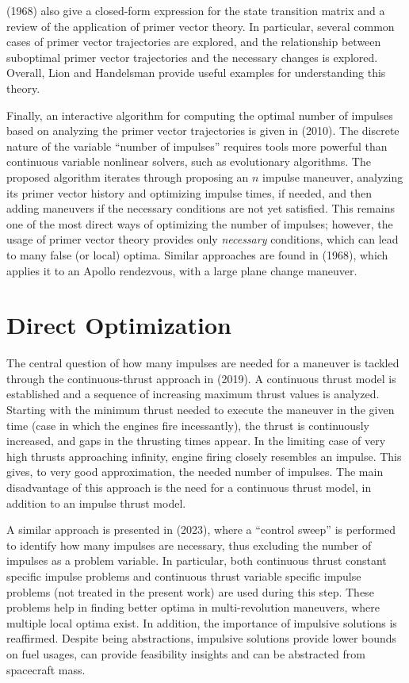 \citeauthor{fixed_time_primer_vector} (1968) also give a closed-form expression for the state transition matrix and a review of the application of primer vector theory. In particular, several common cases of primer vector trajectories are explored, and the relationship between suboptimal primer vector trajectories and the necessary changes is explored. Overall, Lion and Handelsman provide useful examples for understanding this theory. 

Finally, an interactive algorithm for computing the optimal number of impulses based on analyzing the primer vector trajectories is given in \citeauthor{interactive_primer_vector} (2010). The discrete nature of the variable ``number of impulses'' requires tools more powerful than continuous variable nonlinear solvers, such as evolutionary algorithms. The proposed algorithm iterates through proposing an \(n\) impulse maneuver, analyzing its primer vector history and optimizing impulse times, if needed, and then adding maneuvers if the necessary conditions are not yet satisfied. This remains one of the most direct ways of optimizing the number of impulses; however, the usage of primer vector theory provides only \textit{necessary} conditions, which can lead to many false (or local) optima. Similar approaches are found in \citeauthor{efficient_n_impulse} (1968), which applies it to an Apollo rendezvous, with a large plane change maneuver.

\section{Direct Optimization}

The central question of how many impulses are needed for a maneuver is tackled through the continuous-thrust approach in \citeauthor{how_many_impulses} (2019). A continuous thrust model is established and a sequence of increasing maximum thrust values is analyzed. Starting with the minimum thrust needed to execute the maneuver in the given time (case in which the engines fire incessantly), the thrust is continuously increased, and gaps in the thrusting times appear. In the limiting case of very high thrusts approaching infinity, engine firing closely resembles an impulse. This gives, to very good approximation, the needed number of impulses. The main disadvantage of this approach is the need for a continuous thrust model, in addition to an impulse thrust model. 

A similar approach is presented in \citeauthor{mult_rev_many_imp} (2023), where a ``control sweep'' is performed to identify how many impulses are necessary, thus excluding the number of impulses as a problem variable. In particular, both continuous thrust constant specific impulse problems and continuous thrust variable specific impulse problems (not treated in the present work) are used during this step. These problems help in finding better optima in multi-revolution maneuvers, where multiple local optima exist. In addition, the importance of impulsive solutions is reaffirmed. Despite being abstractions, impulsive solutions provide lower bounds on fuel usages, can provide feasibility insights and can be abstracted from spacecraft mass.

